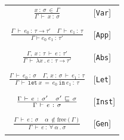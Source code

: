 \documentclass[acmsmall, review, screen]{acmart}
\begin{document}
\begin{table}[h!]
  \begin{center}
    \begin{tabular}{cl} 
      \\
      \(\frac
         {x \ : \ \sigma \ \in \ \Gamma}
        {\Gamma \  \vdash \ x \ : \ \sigma} \) 
      &  [\texttt{Var}]  \\
      \\
      
      \\
      \(\frac
        {\Gamma \  \vdash \ {e}_{0} \ : \ \tau \rightarrow {\tau}' \;\;\;\; \Gamma \  \vdash \  {e}_{1} \ : \ \tau}
        {\Gamma \vdash {e}_{0} \; {e}_{1} \ : \ {\tau}'} \)
      & [\texttt{App}] \\
      \\
      
      \\
      \(\frac
        {\Gamma , \ x \ : \ \tau \ \vdash \ e \ : \ {\tau}'}
        {\Gamma \ \vdash \ \lambda x \ . \ e \ : \ \tau \rightarrow{\tau}'}\)
      & [\texttt{Abs}] \\
      \\
      
      \\
      \(\frac
        {\Gamma \ \vdash \ {e}_{0} \ : \ \sigma \;\;\;\; 
         \Gamma, \ x \ : \ \sigma \ \vdash \ {e}_{1} \ : \ \tau}
        {\Gamma \ \vdash \ \texttt{let} \ x \ = \ {e}_{0} \ \texttt{in} \ {e}_{1} \ : \ \tau}\)
      & [\texttt{Let}] \\ 
      \\
      
      \\
      \(\frac
        {
            \newline
            \Gamma \ \vdash \ e \ : \ {\sigma}' \;\;\;\;
            {\sigma}' \ \sqsubseteq  \ \sigma
        }
        {
            \Gamma \ \vdash \ e \ : \ \sigma
        }\)
      & [\texttt{Inst}] \\
      \\
      
      \\
      \(
       \frac
       {
        \Gamma \ \vdash \ e \ : \ \sigma \;\;\;\;
        \alpha \ \notin \text{free}(\Gamma)
       }
       {
        \Gamma \ \vdash \ e \ : \ \forall \ \alpha \ . \ \sigma
       }
      \)
      & [\texttt{Gen}] \\
      \\
    \end{tabular}
  \end{center}
\end{table}
\end{document}
